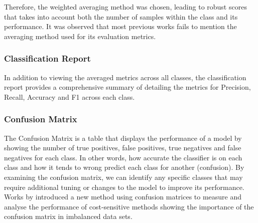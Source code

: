 Therefore, the weighted averaging method was chosen, leading to robust scores that takes into account both the number of samples within the class and its performance. It was observed that most previous works fails to mention the averaging method used for its evaluation metrics.

\subsubsection*{Classification Report}

In addition to viewing the averaged metrics across all classes, the classification report provides a comprehensive summary of detailing the metrics for Precision, Recall, Accuracy and F1 across each class. 

\subsubsection*{Confusion Matrix}

The Confusion Matrix is a table that displays the performance of a model by showing the number of true positives, false positives, true negatives and false negatives for each class. In other words, how accurate the classifier is on each class and how it tends to wrong predict each class for another (confusion). By examining the confusion matrix, we can identify any specific classes that may require additional tuning or changes to the model to improve its performance. Works by \citeauthor{pmlr-v29-Koco13} introduced a new method using confusion matrices to measure and analyse the performance of cost-sensitive methods showing the importance of the confusion matrix in imbalanced data sets.
